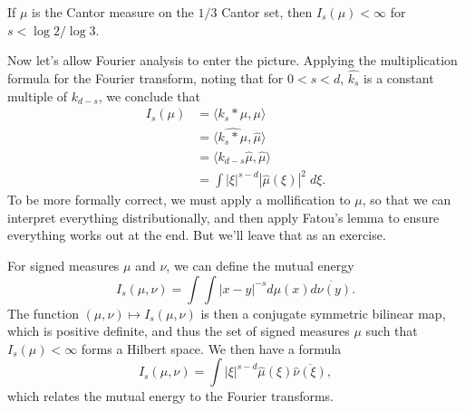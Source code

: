 \begin{example}
  If $\mu$ is the Cantor measure on the $1/3$ Cantor set, then $I_s(\mu) < \infty$ for $s < \log 2 / \log 3$.
\end{example}

Now let's allow Fourier analysis to enter the picture. Applying the multiplication formula for the Fourier transform, noting that for $0 < s < d$, $\widehat{k_s}$ is a constant multiple of $k_{d-s}$, we conclude that
%
\begin{align*}
  I_s(\mu) &= \langle k_s * \mu, \mu \rangle\\
  &= \langle \widehat{k_s * \mu}, \widehat{\mu} \rangle\\
  &= \langle k_{d-s} \widehat{\mu}, \widehat{\mu} \rangle\\
  &= \int |\xi|^{s - d} |\widehat{\mu}(\xi)|^2\; d\xi.
\end{align*}
%
To be more formally correct, we must apply a mollification to $\mu$, so that we can interpret everything distributionally, and then apply Fatou's lemma to ensure everything works out at the end. But we'll leave that as an exercise.

For signed measures $\mu$ and $\nu$, we can define the mutual energy
%
\[ I_s(\mu,\nu) = \int \int |x - y|^{-s} d\mu(x) \overline{d\nu(y)}. \]
%
The function $(\mu,\nu) \mapsto I_s(\mu,\nu)$ is then a conjugate symmetric bilinear map, which is positive definite, and thus the set of signed measures $\mu$ such that $I_s(\mu) < \infty$ forms a Hilbert space. We then have a formula
%
\[ I_s(\mu,\nu) = \int |\xi|^{s - d} \widehat{\mu}(\xi) \overline{\widehat{\nu}(\xi)}, \]
%
which relates the mutual energy to the Fourier transforms.


